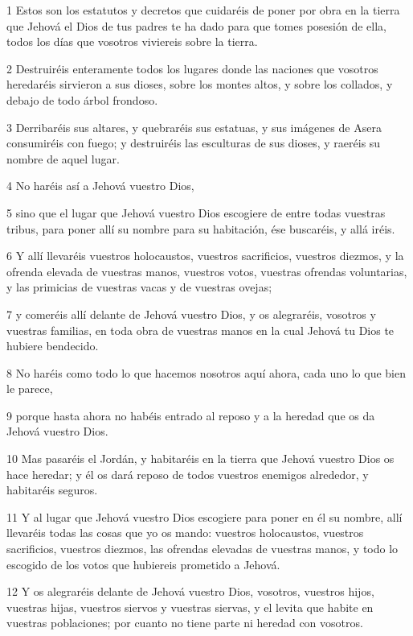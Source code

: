\par 1 Estos son los estatutos y decretos que cuidaréis de poner por obra en la tierra que Jehová el Dios de tus padres te ha dado para que tomes posesión de ella, todos los días que vosotros viviereis sobre la tierra.
\par 2 Destruiréis enteramente todos los lugares donde las naciones que vosotros heredaréis sirvieron a sus dioses, sobre los montes altos, y sobre los collados, y debajo de todo árbol frondoso.
\par 3 Derribaréis sus altares, y quebraréis sus estatuas, y sus imágenes de Asera consumiréis con fuego; y destruiréis las esculturas de sus dioses, y raeréis su nombre de aquel lugar.
\par 4 No haréis así a Jehová vuestro Dios,
\par 5 sino que el lugar que Jehová vuestro Dios escogiere de entre todas vuestras tribus, para poner allí su nombre para su habitación, ése buscaréis, y allá iréis.
\par 6 Y allí llevaréis vuestros holocaustos, vuestros sacrificios, vuestros diezmos, y la ofrenda elevada de vuestras manos, vuestros votos, vuestras ofrendas voluntarias, y las primicias de vuestras vacas y de vuestras ovejas;
\par 7 y comeréis allí delante de Jehová vuestro Dios, y os alegraréis, vosotros y vuestras familias, en toda obra de vuestras manos en la cual Jehová tu Dios te hubiere bendecido.
\par 8 No haréis como todo lo que hacemos nosotros aquí ahora, cada uno lo que bien le parece,
\par 9 porque hasta ahora no habéis entrado al reposo y a la heredad que os da Jehová vuestro Dios.
\par 10 Mas pasaréis el Jordán, y habitaréis en la tierra que Jehová vuestro Dios os hace heredar; y él os dará reposo de todos vuestros enemigos alrededor, y habitaréis seguros.
\par 11 Y al lugar que Jehová vuestro Dios escogiere para poner en él su nombre, allí llevaréis todas las cosas que yo os mando: vuestros holocaustos, vuestros sacrificios, vuestros diezmos, las ofrendas elevadas de vuestras manos, y todo lo escogido de los votos que hubiereis prometido a Jehová.
\par 12 Y os alegraréis delante de Jehová vuestro Dios, vosotros, vuestros hijos, vuestras hijas, vuestros siervos y vuestras siervas, y el levita que habite en vuestras poblaciones; por cuanto no tiene parte ni heredad con vosotros.
